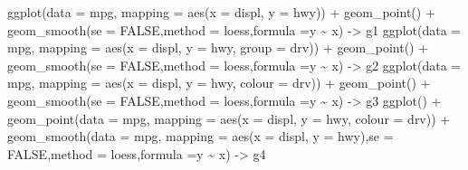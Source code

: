 \documentclass[
]{article}
\newenvironment{Shaded}{\begin{snugshade}}{\end{snugshade}}
\newcommand{\AttributeTok}[1]{\textcolor[rgb]{0.77,0.63,0.00}{#1}}
\newcommand{\ConstantTok}[1]{\textcolor[rgb]{0.00,0.00,0.00}{#1}}
\newcommand{\FunctionTok}[1]{\textcolor[rgb]{0.00,0.00,0.00}{#1}}
\newcommand{\NormalTok}[1]{#1}
\newcommand{\OtherTok}[1]{\textcolor[rgb]{0.56,0.35,0.01}{#1}}
\newcommand{\SpecialCharTok}[1]{\textcolor[rgb]{0.00,0.00,0.00}{#1}}
\newcommand{\StringTok}[1]{\textcolor[rgb]{0.31,0.60,0.02}{#1}}
\begin{document}
\begin{Shaded}
\begin{Highlighting}[]
\FunctionTok{ggplot}\NormalTok{(}\AttributeTok{data =}\NormalTok{ mpg, }\AttributeTok{mapping =} \FunctionTok{aes}\NormalTok{(}\AttributeTok{x =}\NormalTok{ displ, }\AttributeTok{y =}\NormalTok{ hwy)) }\SpecialCharTok{+}
  \FunctionTok{geom\_point}\NormalTok{() }\SpecialCharTok{+}
  \FunctionTok{geom\_smooth}\NormalTok{(}\AttributeTok{se =} \ConstantTok{FALSE}\NormalTok{,}\AttributeTok{method =} \StringTok{\textquotesingle{}loess\textquotesingle{}}\NormalTok{,}\AttributeTok{formula =}\NormalTok{y }\SpecialCharTok{\textasciitilde{}}\NormalTok{ x) }\OtherTok{{-}\textgreater{}}\NormalTok{ g1}
\FunctionTok{ggplot}\NormalTok{(}\AttributeTok{data =}\NormalTok{ mpg, }\AttributeTok{mapping =} \FunctionTok{aes}\NormalTok{(}\AttributeTok{x =}\NormalTok{ displ, }\AttributeTok{y =}\NormalTok{ hwy, }\AttributeTok{group =}\NormalTok{ drv)) }\SpecialCharTok{+}
  \FunctionTok{geom\_point}\NormalTok{() }\SpecialCharTok{+}
  \FunctionTok{geom\_smooth}\NormalTok{(}\AttributeTok{se =} \ConstantTok{FALSE}\NormalTok{,}\AttributeTok{method =} \StringTok{\textquotesingle{}loess\textquotesingle{}}\NormalTok{,}\AttributeTok{formula =}\NormalTok{y }\SpecialCharTok{\textasciitilde{}}\NormalTok{ x) }\OtherTok{{-}\textgreater{}}\NormalTok{ g2}
\FunctionTok{ggplot}\NormalTok{(}\AttributeTok{data =}\NormalTok{ mpg, }\AttributeTok{mapping =} \FunctionTok{aes}\NormalTok{(}\AttributeTok{x =}\NormalTok{ displ, }\AttributeTok{y =}\NormalTok{ hwy, }\AttributeTok{colour =}\NormalTok{ drv)) }\SpecialCharTok{+}
  \FunctionTok{geom\_point}\NormalTok{() }\SpecialCharTok{+}
  \FunctionTok{geom\_smooth}\NormalTok{(}\AttributeTok{se =} \ConstantTok{FALSE}\NormalTok{,}\AttributeTok{method =} \StringTok{\textquotesingle{}loess\textquotesingle{}}\NormalTok{,}\AttributeTok{formula =}\NormalTok{y }\SpecialCharTok{\textasciitilde{}}\NormalTok{ x) }\OtherTok{{-}\textgreater{}}\NormalTok{ g3}
\FunctionTok{ggplot}\NormalTok{() }\SpecialCharTok{+}
  \FunctionTok{geom\_point}\NormalTok{(}\AttributeTok{data =}\NormalTok{ mpg, }\AttributeTok{mapping =} \FunctionTok{aes}\NormalTok{(}\AttributeTok{x =}\NormalTok{ displ, }\AttributeTok{y =}\NormalTok{ hwy, }\AttributeTok{colour =}\NormalTok{ drv)) }\SpecialCharTok{+}
  \FunctionTok{geom\_smooth}\NormalTok{(}\AttributeTok{data =}\NormalTok{ mpg, }\AttributeTok{mapping =} \FunctionTok{aes}\NormalTok{(}\AttributeTok{x =}\NormalTok{ displ, }\AttributeTok{y =}\NormalTok{ hwy),}\AttributeTok{se =} \ConstantTok{FALSE}\NormalTok{,}\AttributeTok{method =} \StringTok{\textquotesingle{}loess\textquotesingle{}}\NormalTok{,}\AttributeTok{formula =}\NormalTok{y }\SpecialCharTok{\textasciitilde{}}\NormalTok{ x) }\OtherTok{{-}\textgreater{}}\NormalTok{ g4}

\end{Highlighting}
\end{Shaded}
\end{document}
